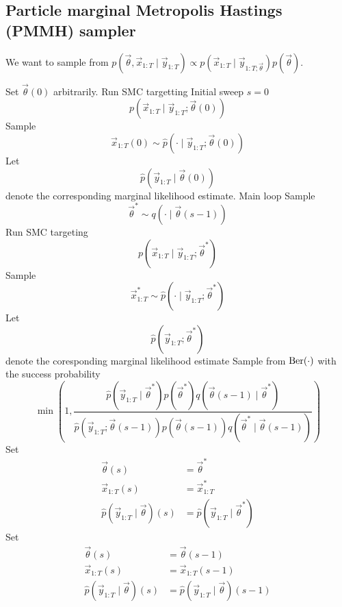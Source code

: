 \subsection{Particle marginal Metropolis Hastings (PMMH) sampler}
We want to sample from $p(\vec \theta, \vec x_{1:T} \mid \vec y_{1:T}) \propto p(\vec x_{1:T} \mid \vec y_{1:T; \vec \theta}) p(\vec \theta)$.
    \begin{algorithmbis}\label{alg:pmmh}
        \begin{algorithmic}[1]
            \State Set $\vec \theta(0)$ arbitrarily.
            \State Run SMC targetting \Comment Initial sweep $s = 0$
                $$p(\vec x_{1:T} \mid \vec y_{1:T}; \vec \theta(0))$$
            \State Sample
                $$\vec x_{1:T}(0) \sim \hat p(\cdot \mid \vec y_{1:T}; \vec \theta(0))$$
            \State Let
                $$\hat p(\vec y_{1:T} \mid \vec \theta(0))$$
                denote the corresponding marginal likelihood estimate.
             \Comment Main loop
                \State Sample
                    $$\vec \theta^\ast \sim q(\cdot \mid \vec \theta(s - 1))$$
                \State Run SMC targeting
                    $$p(\vec x_{1:T} \mid \vec y_{1:T}; \vec \theta^\ast)$$
                \State Sample
                    $$\vec x^\ast_{1:T} \sim \hat p(\cdot \mid \vec y_{1:T}; \vec \theta^\ast)$$
                \State Let
                    $$\hat p(\vec y_{1:T}; \vec \theta^\ast)$$
                    denote the coresponding marginal likelihood estimate
                \State Sample from $\operatorname{Ber}(\cdot)$ with the success probability
                    $$\min\left(1, \frac{\hat p(\vec y_{1:T} \mid \vec \theta^\ast) p(\vec \theta^\ast) q(\vec \theta(s - 1) \mid \vec \theta^\ast)}{\hat p(\vec y_{1:T}; \vec \theta(s - 1)) p(\vec \theta(s - 1)) q(\vec \theta^\ast \mid \vec \theta(s - 1))}\right)$$
                    \State Set
                        \begin{align*}
                            \vec \theta(s)                              &= \vec \theta^\ast \\
                            \vec x_{1:T}(s)                             &= \vec x_{1:T}^\ast \\
                            \hat p(\vec y_{1:T} \mid \vec \theta)(s)    &= \hat p(\vec y_{1:T} \mid \vec \theta^\ast)
                        \end{align*}
                \Else
                    \State Set
                        \begin{align*}
                            \vec \theta(s)                              &= \vec \theta(s - 1) \\
                            \vec x_{1:T}(s)                             &= \vec x_{1:T}(s - 1) \\
                            \hat p(\vec y_{1:T} \mid \vec \theta)(s)    &= \hat p(\vec y_{1:T} \mid \vec \theta)(s - 1)
                        \end{align*}
                \EndIf
            \EndFor
        \end{algorithmic}
    \end{algorithmbis}